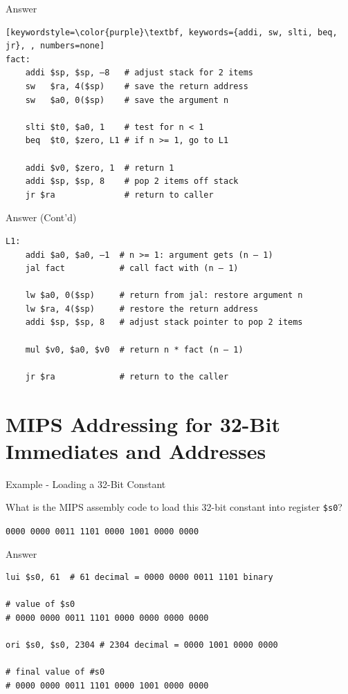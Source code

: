 \begin{frame}[fragile]{Answer}
\begin{lstlisting}[keywordstyle=\color{purple}\textbf, keywords={addi, sw, slti, beq, jr}, , numbers=none]
fact:
    addi $sp, $sp, –8   # adjust stack for 2 items
    sw   $ra, 4($sp)    # save the return address
    sw   $a0, 0($sp)    # save the argument n
    
    slti $t0, $a0, 1    # test for n < 1
    beq  $t0, $zero, L1 # if n >= 1, go to L1
    
    addi $v0, $zero, 1  # return 1
    addi $sp, $sp, 8    # pop 2 items off stack
    jr $ra              # return to caller
\end{lstlisting}
\end{frame}

\begin{frame}[fragile]{Answer (Cont'd)}
\begin{lstlisting}[keywordstyle=\color{purple}\textbf, keywords={addi, jal, lw, mul, jr}, numbers=none]
L1: 
    addi $a0, $a0, –1  # n >= 1: argument gets (n – 1)
    jal fact           # call fact with (n – 1)

    lw $a0, 0($sp)     # return from jal: restore argument n
    lw $ra, 4($sp)     # restore the return address
    addi $sp, $sp, 8   # adjust stack pointer to pop 2 items
    
    mul $v0, $a0, $v0  # return n * fact (n – 1)

    jr $ra             # return to the caller
\end{lstlisting}
\end{frame}

\section{MIPS Addressing for 32-Bit Immediates and Addresses}
\begin{frame}{Example - Loading a 32-Bit Constant}
\begin{flushleft}
What is the MIPS assembly code to load this 32-bit constant into register \texttt{\$s0}?

\hspace{8mm}\texttt{0000 0000 0011 1101 0000 1001 0000 0000}
\end{flushleft}
\end{frame}

\begin{frame}[fragile]{Answer}
\begin{lstlisting}[keywordstyle=\color{purple}\textbf, keywords={lui, ori}]
lui $s0, 61  # 61 decimal = 0000 0000 0011 1101 binary

# value of $s0 
# 0000 0000 0011 1101 0000 0000 0000 0000

ori $s0, $s0, 2304 # 2304 decimal = 0000 1001 0000 0000

# final value of #s0
# 0000 0000 0011 1101 0000 1001 0000 0000
\end{lstlisting}
\end{frame}

